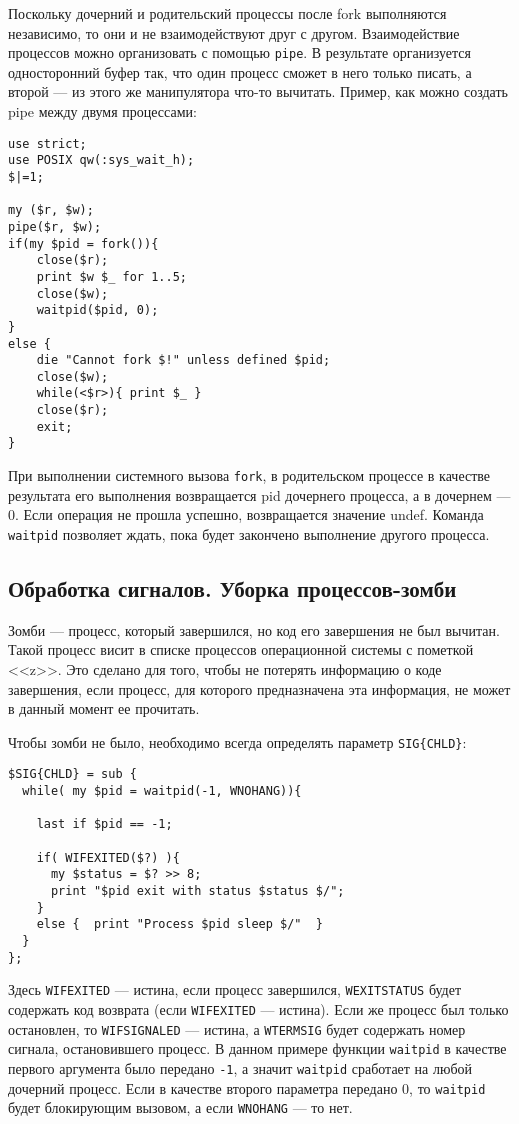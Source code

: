 Поскольку дочерний и родительский процессы после fork выполняются независимо, то они и не взаимодействуют друг с другом. Взаимодействие процессов можно организовать с помощью \verb|pipe|. В результате организуется односторонний буфер так, что один процесс сможет в него только писать, а второй --- из этого же манипулятора что-то вычитать. Пример, как можно создать pipe между двумя процессами:
\begin{verbatim}
use strict;
use POSIX qw(:sys_wait_h);
$|=1;

my ($r, $w);
pipe($r, $w);
if(my $pid = fork()){
    close($r);
    print $w $_ for 1..5;
    close($w);
    waitpid($pid, 0);
}
else {
    die "Cannot fork $!" unless defined $pid;
    close($w);
    while(<$r>){ print $_ }
    close($r);
    exit;
}
\end{verbatim}
При выполнении системного вызова \verb|fork|, в родительском процессе в качестве результата его выполнения возвращается pid дочернего процесса, а в дочернем --- 0. Если операция не прошла успешно, возвращается значение undef. Команда \verb|waitpid| позволяет ждать, пока будет закончено выполнение другого процесса.

\subsection{Обработка сигналов. Уборка процессов-зомби}
Зомби --- процесс, который завершился, но код его завершения не был вычитан. Такой процесс висит в списке процессов операционной системы с пометкой <<z>>. Это сделано для того, чтобы не потерять информацию о коде завершения, если процесс, для которого предназначена эта информация, не может в данный момент ее прочитать.

Чтобы зомби не было, необходимо всегда определять параметр \verb|SIG{CHLD}|:
\begin{verbatim}
$SIG{CHLD} = sub {
  while( my $pid = waitpid(-1, WNOHANG)){

    last if $pid == -1;

    if( WIFEXITED($?) ){
      my $status = $? >> 8;
      print "$pid exit with status $status $/";
    }
    else {  print "Process $pid sleep $/"  }
  }
};
\end{verbatim}
Здесь \verb|WIFEXITED| --- истина, если процесс завершился, \verb|WEXITSTATUS| будет содержать код возврата (если \verb|WIFEXITED| --- истина). Если же процесс был только остановлен, то \verb|WIFSIGNALED| --- истина, а \verb|WTERMSIG| будет содержать номер сигнала, остановившего процесс. В данном примере функции \verb|waitpid| в качестве первого аргумента было передано \verb|-1|, а значит \verb|waitpid| сработает на любой дочерний процесс. Если в качестве второго параметра передано 0, то \verb|waitpid| будет блокирующим вызовом, а если \verb|WNOHANG| --- то нет.

